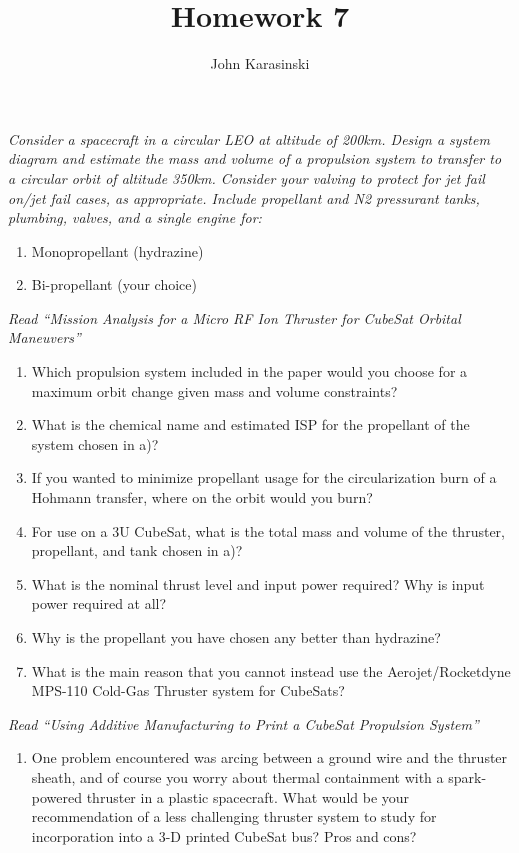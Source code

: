\documentclass[onecolumn,10pt]{jhwhw}
\author{John Karasinski}
\title{Homework 7}
\begin{document}

\problem{}
\textit{Consider a spacecraft in a circular LEO at altitude of 200km. Design a system diagram and estimate the mass and volume of a propulsion system to transfer to a circular orbit of altitude 350km. Consider your valving to protect for jet fail on/jet fail cases, as appropriate. Include propellant and N2 pressurant tanks, plumbing, valves, and a single engine for:}
\begin{enumerate}
\item Monopropellant (hydrazine)
\item Bi-propellant (your choice)
\end{enumerate}

\problem{}
\textit{Read ``Mission Analysis for a Micro RF Ion Thruster for CubeSat Orbital Maneuvers''}
\begin{enumerate}
\item Which propulsion system included in the paper would you choose for a maximum orbit change given mass and volume constraints?
\item What is the chemical name and estimated ISP for the propellant of the system chosen in a)?
\item If you wanted to minimize propellant usage for the circularization burn of a Hohmann transfer, where on the orbit would you burn?
\item For use on a 3U CubeSat, what is the total mass and volume of the thruster, propellant, and tank chosen in a)?
\item What is the nominal thrust level and input power required? Why is input power required at all?
\item Why is the propellant you have chosen any better than hydrazine?
\item What is the main reason that you cannot instead use the Aerojet/Rocketdyne MPS-110 Cold-Gas Thruster system for CubeSats?
\end{enumerate}

\problem{}
\textit{Read ``Using Additive Manufacturing to Print a CubeSat Propulsion System''}
\begin{enumerate}
\item One problem encountered was arcing between a ground wire and the thruster sheath, and of course you worry about thermal containment with a spark-powered thruster in a plastic spacecraft. What would be your recommendation of a less challenging thruster system to study for incorporation into a 3-D printed CubeSat bus? Pros and cons?
\end{enumerate}
\end{document}
